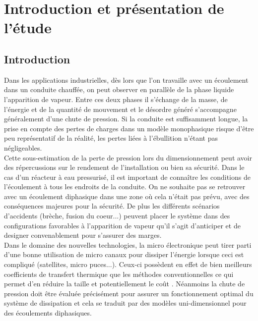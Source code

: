 \section{Introduction et présentation de l'étude\label{section:pres}}

\subsection{Introduction}

Dans les applications industrielles, dès lors que l'on travaille avec un écoulement dans un conduite chauffée, on peut observer en parallèle de la phase liquide l'apparition de vapeur. Entre ces deux phases il s'échange de la masse, de l'énergie et de la quantité de mouvement et le désordre généré s'accompagne généralement d'une chute de pression. Si la conduite est suffisamment longue, la prise en compte des pertes de charges dans un modèle monophasique risque d'être peu représentatif de la réalité, les pertes liées à l'ébullition n'étant pas négligeables.\\

Cette sous-estimation de la perte de pression lors du dimensionnement peut avoir des répercussions sur le rendement de l'installation ou bien sa sécurité. Dans le cas d'un réacteur à eau pressurisé, il est important de connaître les conditions de l'écoulement à tous les endroits de la conduite. On ne souhaite pas se retrouver avec un écoulement diphasique dans une zone où cela n'était pas prévu, avec des conséquences majeures pour la sécurité. De plus les différents scénarios d'accidents (brèche, fusion du coeur...) peuvent placer le système dans des configurations favorables à l'apparition de vapeur qu'il s'agit d'anticiper et de designer convenablement pour s'assurer des marges.\\


Dans le domaine des nouvelles technologies, la micro électronique peut tirer parti d'une bonne utilisation de micro canaux pour dissiper l'énergie lorsque ceci est compliqué (satellites, micro puces...). Ceux-ci possèdent en effet de bien meilleurs coefficients de transfert thermique que les méthodes conventionnelles ce qui permet d'en réduire la taille et potentiellement le coût \cite{revellinAdiabaticTwophaseFrictional2007}. Néanmoins la chute de pression doit être évaluée précisément pour assurer un fonctionnement optimal du système de dissipation et cela se traduit par des modèles uni-dimensionnel pour des écoulements diphasiques. \\

